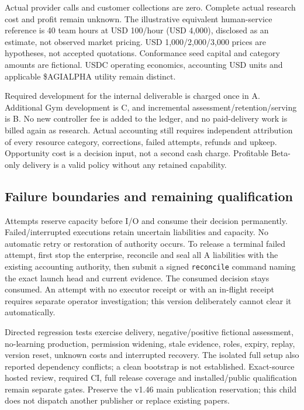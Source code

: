\documentclass[
  10pt,
]{article}
\begin{document}
Actual provider calls and customer collections are zero. Complete actual
research cost and profit remain unknown. The illustrative equivalent
human-service reference is 40 team hours at USD 100/hour (USD 4,000),
disclosed as an estimate, not observed market pricing. USD
1,000/2,000/3,000 prices are hypotheses, not accepted quotations.
Conformance seed capital and category amounts are fictional. USDC
operating economics, accounting USD units and applicable \$AGIALPHA
utility remain distinct.

Required development for the internal deliverable is charged once in A.
Additional Gym development is C, and incremental
assessment/retention/serving is B. No new controller fee is added to the
ledger, and no paid-delivery work is billed again as research. Actual
accounting still requires independent attribution of every resource
category, corrections, failed attempts, refunds and upkeep. Opportunity
cost is a decision input, not a second cash charge. Profitable Beta-only
delivery is a valid policy without any retained capability.

\hypertarget{failure-boundaries-and-remaining-qualification}{%
\subsection{Failure boundaries and remaining
qualification}\label{failure-boundaries-and-remaining-qualification}}

Attempts reserve capacity before I/O and consume their decision
permanently. Failed/interrupted executions retain uncertain liabilities
and capacity. No automatic retry or restoration of authority occurs. To
release a terminal failed attempt, first stop the enterprise, reconcile
and seal all A liabilities with the existing accounting authority, then
submit a signed \texttt{reconcile} command naming the exact launch head
and current evidence. The consumed decision stays consumed. An attempt
with no executor receipt or with an in-flight receipt requires separate
operator investigation; this version deliberately cannot clear it
automatically.

Directed regression tests exercise delivery, negative/positive fictional
assessment, no-learning production, permission widening, stale evidence,
roles, expiry, replay, version reset, unknown costs and interrupted
recovery. The isolated full setup also reported dependency conflicts; a
clean bootstrap is not established. Exact-source hosted review, required
CI, full release coverage and installed/public qualification remain
separate gates. Preserve the v1.46 main publication reservation; this
child does not dispatch another publisher or replace existing papers.
\end{document}
